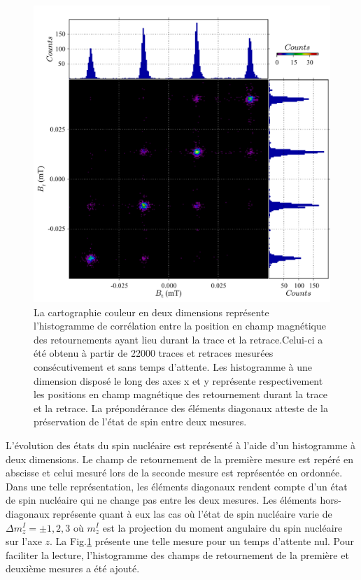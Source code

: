 \begin{figure}
\includegraphics[scale=0.45]{Resultats/Chap2/Figure1/figure1.pdf} 
\caption{La cartographie couleur en deux dimensions représente l’histogramme de corrélation entre la position en champ magnétique des retournements ayant lieu durant la trace et la retrace.Celui-ci a été obtenu à partir de 22000 traces et retraces mesurées consécutivement et sans temps d'attente. Les histogramme à une dimension disposé le long des axes x et y représente respectivement les positions en champ magnétique des retournement durant la trace et la retrace. La prépondérance des éléments diagonaux atteste de la préservation de l'état de spin entre deux mesures.}
\label{correlations}
\end{figure}

L'évolution des états du spin nucléaire est représenté à l'aide d'un histogramme à deux dimensions. Le champ de retournement de la première mesure est repéré en abscisse et celui mesuré lors de la seconde mesure est représentée en ordonnée. Dans une telle représentation, les éléments diagonaux rendent compte d'un état de spin nucléaire qui ne change pas entre les deux mesures. Les éléments hors-diagonaux représente quant à eux las cas où l'état de spin nucléaire varie de $\Delta m_z^I = \pm 1,2,3$ où $m_z^I$ est la projection du moment angulaire du spin nucléaire sur l'axe $z$. La Fig.\ref{correlations} présente une telle mesure pour un temps d'attente nul. Pour faciliter la lecture, l'histogramme des champs de retournement de la première et deuxième mesures a été ajouté.

